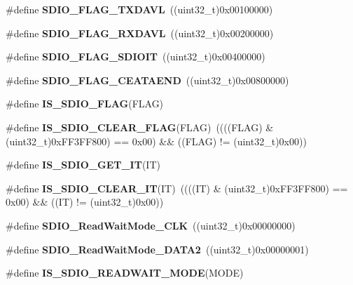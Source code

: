 \begin{DoxyCompactItemize}
$$\item 
\#define \textbf{ S\+D\+I\+O\+\_\+\+F\+L\+A\+G\+\_\+\+T\+X\+D\+A\+VL}~((uint32\+\_\+t)0x00100000)
\item 
\#define \textbf{ S\+D\+I\+O\+\_\+\+F\+L\+A\+G\+\_\+\+R\+X\+D\+A\+VL}~((uint32\+\_\+t)0x00200000)
\item 
\#define \textbf{ S\+D\+I\+O\+\_\+\+F\+L\+A\+G\+\_\+\+S\+D\+I\+O\+IT}~((uint32\+\_\+t)0x00400000)
\item 
\#define \textbf{ S\+D\+I\+O\+\_\+\+F\+L\+A\+G\+\_\+\+C\+E\+A\+T\+A\+E\+ND}~((uint32\+\_\+t)0x00800000)
\item 
\#define \textbf{ I\+S\+\_\+\+S\+D\+I\+O\+\_\+\+F\+L\+AG}(F\+L\+AG)
\item 
\#define \textbf{ I\+S\+\_\+\+S\+D\+I\+O\+\_\+\+C\+L\+E\+A\+R\+\_\+\+F\+L\+AG}(F\+L\+AG)~((((F\+L\+AG) \& (uint32\+\_\+t)0x\+F\+F3\+F\+F800) == 0x00) \&\& ((\+F\+L\+A\+G) != (uint32\+\_\+t)0x00))
\item 
\#define \textbf{ I\+S\+\_\+\+S\+D\+I\+O\+\_\+\+G\+E\+T\+\_\+\+IT}(IT)
\item 
\#define \textbf{ I\+S\+\_\+\+S\+D\+I\+O\+\_\+\+C\+L\+E\+A\+R\+\_\+\+IT}(IT)~((((IT) \& (uint32\+\_\+t)0x\+F\+F3\+F\+F800) == 0x00) \&\& ((\+I\+T) != (uint32\+\_\+t)0x00))
\item 
\#define \textbf{ S\+D\+I\+O\+\_\+\+Read\+Wait\+Mode\+\_\+\+C\+LK}~((uint32\+\_\+t)0x00000000)
\item 
\#define \textbf{ S\+D\+I\+O\+\_\+\+Read\+Wait\+Mode\+\_\+\+D\+A\+T\+A2}~((uint32\+\_\+t)0x00000001)
\item 
\#define \textbf{ I\+S\+\_\+\+S\+D\+I\+O\+\_\+\+R\+E\+A\+D\+W\+A\+I\+T\+\_\+\+M\+O\+DE}(M\+O\+DE)
\end{DoxyCompactItemize}
